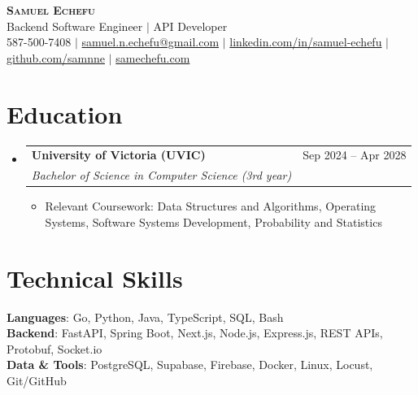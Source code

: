 \documentclass[letterpaper,10pt]{article}
\makeatletter
\newcommand{\resumeItem}[1]{
  \item\small{
    {#1 \vspace{-1pt}}
  }
}
\newcommand{\resumeSubheading}[4]{
  \vspace{-2pt}\item
    \begin{tabular*}{0.97\textwidth}[t]{l@{\extracolsep{\fill}}r}
      \textbf{#1} & #2 \\
      \textit{\small#3} & \textit{\small #4} \\
    \end{tabular*}\vspace{-6pt}
}
\newcommand{\resumeSubHeadingListStart}{\begin{itemize}[leftmargin=0.15in, label={}]}
\newcommand{\resumeSubHeadingListEnd}{\end{itemize}}
\newcommand{\resumeItemListStart}{\begin{itemize}[label=$\bullet$, itemsep=1.80pt, topsep=0pt, parsep=0pt]}
\newcommand{\resumeItemListEnd}{\end{itemize}\vspace{-2pt}}
\makeatother
\begin{document}
\begin{center}
    \textbf{\Huge \scshape Samuel Echefu} \\ \vspace{3pt}
    \small Backend Software Engineer $|$ API Developer \\ \vspace{3pt}
    \small 587-500-7408 $|$ \href{mailto:samuel.n.echefu@gmail.com}{samuel.n.echefu@gmail.com} $|$ 
    \href{https://linkedin.com/in/samuel-echefu-251a21336}{linkedin.com/in/samuel-echefu} $|$
    \href{https://github.com/samnne}{github.com/samnne} $|$
    \href{https://samechefu.com}{samechefu.com}
\end{center}


\section{Education}
\resumeSubHeadingListStart
\resumeSubheading{University of Victoria (UVIC)}{Sep 2024 -- Apr 2028}{Bachelor of Science in Computer Science (3rd year)}{}
\resumeItemListStart
  \resumeItem{Relevant Coursework: Data Structures and Algorithms, Operating Systems, Software Systems Development, Probability and Statistics}
\resumeItemListEnd
\resumeSubHeadingListEnd

\section{Technical Skills}
 \begin{itemize}[leftmargin=0.15in, label={}]
    \small{\item{
     \textbf{Languages}{: Go, Python, Java, TypeScript, SQL, Bash} \\ \vspace{0pt}
     \textbf{Backend}{: FastAPI, Spring Boot, Next.js, Node.js, Express.js, REST APIs, Protobuf, Socket.io} \\ \vspace{0pt}
     \textbf{Data \& Tools}{: PostgreSQL, Supabase, Firebase, Docker, Linux, Locust, Git/GitHub}
    }}
 \end{itemize}
\end{document}
